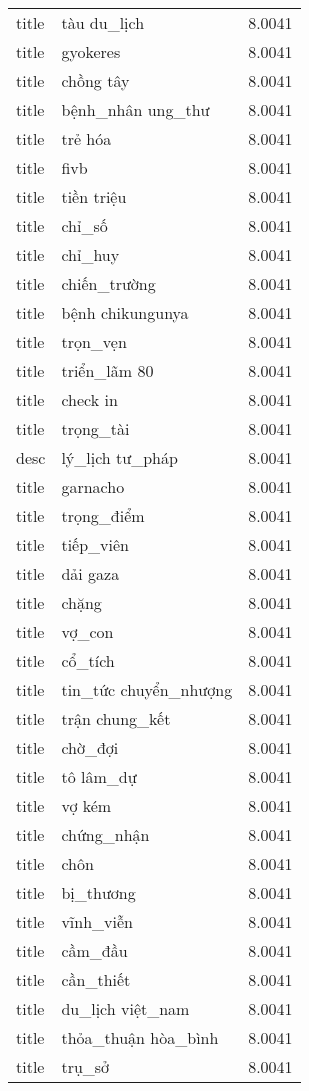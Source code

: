 \documentclass{article}
\begin{document}
\begin{tabular}{lll}
title & tàu du\_lịch & 8.0041\\
title & gyokeres & 8.0041\\
title & chồng tây & 8.0041\\
title & bệnh\_nhân ung\_thư & 8.0041\\
title & trẻ hóa & 8.0041\\
title & fivb & 8.0041\\
title & tiền triệu & 8.0041\\
title & chỉ\_số & 8.0041\\
title & chỉ\_huy & 8.0041\\
title & chiến\_trường & 8.0041\\
title & bệnh chikungunya & 8.0041\\
title & trọn\_vẹn & 8.0041\\
title & triển\_lãm 80 & 8.0041\\
title & check in & 8.0041\\
title & trọng\_tài & 8.0041\\
desc & lý\_lịch tư\_pháp & 8.0041\\
title & garnacho & 8.0041\\
title & trọng\_điểm & 8.0041\\
title & tiếp\_viên & 8.0041\\
title & dải gaza & 8.0041\\
title & chặng & 8.0041\\
title & vợ\_con & 8.0041\\
title & cổ\_tích & 8.0041\\
title & tin\_tức chuyển\_nhượng & 8.0041\\
title & trận chung\_kết & 8.0041\\
title & chờ\_đợi & 8.0041\\
title & tô lâm\_dự & 8.0041\\
title & vợ kém & 8.0041\\
title & chứng\_nhận & 8.0041\\
title & chôn & 8.0041\\
title & bị\_thương & 8.0041\\
title & vĩnh\_viễn & 8.0041\\
title & cầm\_đầu & 8.0041\\
title & cần\_thiết & 8.0041\\
title & du\_lịch việt\_nam & 8.0041\\
title & thỏa\_thuận hòa\_bình & 8.0041\\
title & trụ\_sở & 8.0041\\

\end{tabular}
\end{document}
